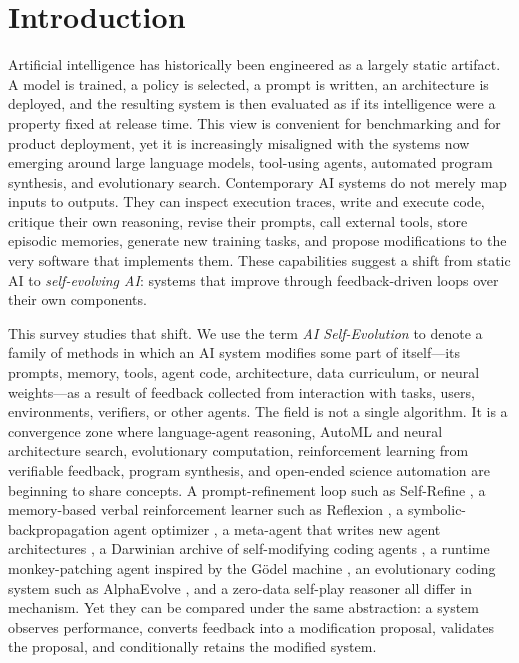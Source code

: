 \section{Introduction}
\label{sec:introduction}

Artificial intelligence has historically been engineered as a largely static artifact. A model is trained, a policy is selected, a prompt is written, an architecture is deployed, and the resulting system is then evaluated as if its intelligence were a property fixed at release time. This view is convenient for benchmarking and for product deployment, yet it is increasingly misaligned with the systems now emerging around large language models, tool-using agents, automated program synthesis, and evolutionary search. Contemporary AI systems do not merely map inputs to outputs. They can inspect execution traces, write and execute code, critique their own reasoning, revise their prompts, call external tools, store episodic memories, generate new training tasks, and propose modifications to the very software that implements them. These capabilities suggest a shift from static AI to \emph{self-evolving AI}: systems that improve through feedback-driven loops over their own components.

This survey studies that shift. We use the term \emph{AI Self-Evolution} to denote a family of methods in which an AI system modifies some part of itself---its prompts, memory, tools, agent code, architecture, data curriculum, or neural weights---as a result of feedback collected from interaction with tasks, users, environments, verifiers, or other agents. The field is not a single algorithm. It is a convergence zone where language-agent reasoning, AutoML and neural architecture search, evolutionary computation, reinforcement learning from verifiable feedback, program synthesis, and open-ended science automation are beginning to share concepts. A prompt-refinement loop such as Self-Refine \cite{selfrefine2023}, a memory-based verbal reinforcement learner such as Reflexion \cite{reflexion2023}, a symbolic-backpropagation agent optimizer \cite{agentsymboliclearning2024}, a meta-agent that writes new agent architectures \cite{adas2025}, a Darwinian archive of self-modifying coding agents \cite{darwingodelmachine2025}, a runtime monkey-patching agent inspired by the G{\"o}del machine \cite{yin2024godel,schmidhuber2003}, an evolutionary coding system such as AlphaEvolve \cite{alphaevolve2025}, and a zero-data self-play reasoner \cite{absolutezero2025} all differ in mechanism. Yet they can be compared under the same abstraction: a system observes performance, converts feedback into a modification proposal, validates the proposal, and conditionally retains the modified system.

